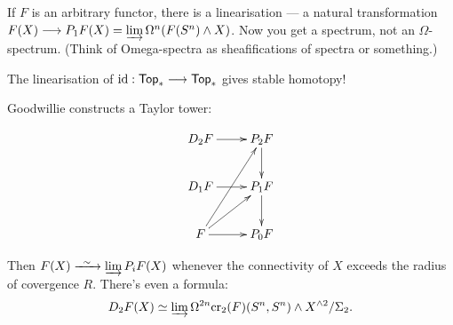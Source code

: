 \documentclass[11pt]{article}
\begin{document}
\begin{BehrensGoodwillieCalcIntro}
If $F$ is an arbitrary functor, there is a linearisation --- a natural transformation $F(X)\longrightarrow P_1F(X)=\varinjlim\Omega^n(F(S^n)\wedge X)$. Now you get a spectrum, not an $\Omega$-spectrum. (Think of Omega-spectra as sheafifications of spectra or something.)
\begin{exmp*}
The linearisation of $\textup{id}:\operatorname{{\mathsf{Top}}}_*\longrightarrow\operatorname{{\mathsf{Top}}}_*$ gives stable homotopy!
\end{exmp*}


Goodwillie constructs a Taylor tower:

\[\xymatrix{
D_2F\ar[r]&\ar[d]P_2F\\
D_1F\ar[r]&\ar[d]P_1F\\
F\ar[r]\ar[ru]\ar[ruu]&P_0F
}
\]

Then $F(X)\weakequiv \varinjlim P_iF(X)$ whenever the connectivity of $X$ exceeds the radius of covergence $R$. There's even a formula:
\[D_2F(X)\simeq\varinjlim \Omega^{2n}\textup{cr}_2(F)(S^n,S^n)\wedge X^{\wedge2}/\Sigma_2.\]

\pagebreak
\end{BehrensGoodwillieCalcIntro}
\end{document}
